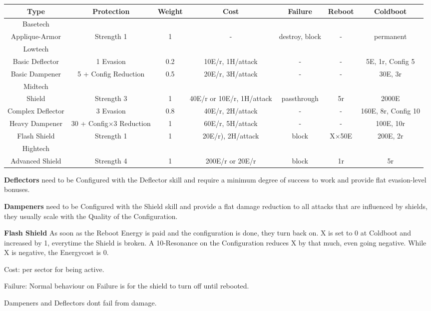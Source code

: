 \begin{tabular}{c|cccccc}
    Type & Protection &Weight& Cost & Failure  & Reboot & Coldboot \\
    \hline Basetech\\
    Applique-Armor & Strength 1 & 1 & - & destroy, block & - & permanent \\
    \hline Lowtech\\
    Basic Deflector & 1 Evasion & 0.2 & 10E/r, 1H/attack & - & - & 5E, 1r, Config 5\\
    Basic Dampener & 5 + Config Reduction & 0.5 & 20E/r, 3H/attack & - & - & 30E, 3r \\
    \hline Midtech\\
    Shield & Strength 3 & 1 & 40E/r or 10E/r, 1H/attack & passthrough & 5r & 2000E \\
    Complex Deflector & 3 Evasion & 0.8 & 40E/r, 2H/attack & - & - & 160E, 8r, Config 10\\
    Heavy Dampener & 30 + Config\(\times 3\) Reduction & 1 & 60E/r, 5H/attack & - & - & 100E, 10r\\
    Flash Shield & Strength 1 & 1 & 20E/r), 2H/attack & block & X\(\times\)50E & 200E, 2r\\
    \hline Hightech\\
    Advanced Shield & Strength 4 & 1 & 200E/r or 20E/r & block & 1r & 5r
\end{tabular}

\vspace{1cm}

\textbf{Deflectors} need to be Configured with the Deflector skill and require a minimum degree of success to
work and provide flat evasion-level bonuses.

\textbf{Dampeners} need to be Configured with the Shield skill and provide a flat damage reduction to all
attacks that are influenced by shields, they usually scale with the Quality of the Configuration.

\textbf{Flash Shield} As soon as the Reboot Energy is paid and the configuration is done, they turn back on.
X is set to 0 at Coldboot and increased by 1, everytime the Shield is broken.
A 10-Resonance on the Configuration reduces X by that much, even going negative.
While X is negative, the Energycost is 0.

Cost: per sector for being active.

Failure: Normal behaviour on Failure is for the shield to turn off until rebooted.

Dampeners and Deflectors dont fail from damage.

